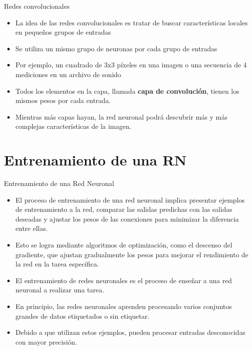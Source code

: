 \documentclass[11pt,aspectratio=169]{beamer}
\begin{document}
\begin{frame}{Redes convolucionales}
	\begin{itemize}
		\item La idea de las redes convolucionales es tratar de buscar características locales en pequeños 
			grupos de entradas\pause
		\item Se utiliza un mismo grupo de neuronas por cada grupo de entradas \pause
		\item Por ejemplo, un cuadrado de 3x3 píxeles en una imagen o una secuencia de 4 mediciones en un 
			archivo de sonido \pause
		\item Todos los elementos en la capa, llamada \textbf{capa de convolución}, tienen los mismos pesos 
			por cada entrada.\pause
		\item Mientras más capas hayan, la red neuronal podrá descubrir más y más complejas características 
			de la imagen.
	\end{itemize}
\end{frame}

\section{Entrenamiento de una RN}
\begin{frame}{Entrenamiento de una Red Neuronal}
	\begin{itemize}
		\item El proceso de entrenamiento de una red neuronal implica presentar ejemplos de entrenamiento a la red, comparar las salidas 
			predichas con las salidas deseadas y ajustar los pesos de las conexiones para minimizar la diferencia entre ellas.\pause
		\item Esto se logra mediante algoritmos de optimización, como el descenso del gradiente, que ajustan gradualmente los pesos 
			para mejorar el rendimiento de la red en la tarea específica.\pause
		\item El entrenamiento de redes neuronales es el proceso de enseñar a una red neuronal a realizar una tarea.\pause 
		\item En principio, las redes neuronales aprenden procesando varios conjuntos grandes de datos etiquetados o sin etiquetar.\pause
		\item Debido a que utilizan estos ejemplos, pueden procesar entradas desconocidas con mayor precisión.
	\end{itemize}
\end{frame}
\end{document}
